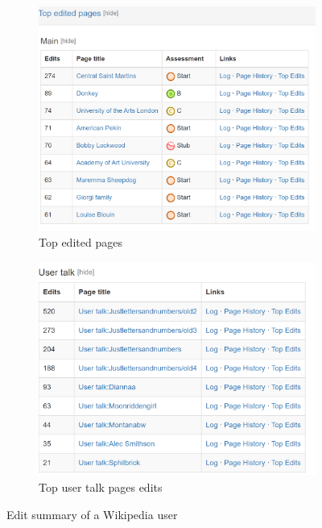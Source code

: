 \begin{figure}[!ht]
    \begin{subfigure}{0.49\textwidth}
        \centering
        \includegraphics[width=\textwidth]{images/editor_top_edits.PNG}
        \caption{Top edited pages}
        \label{fig:top-edits}
    \end{subfigure}
    \begin{subfigure}{0.49\textwidth}
        \centering
        \includegraphics[width=\textwidth]{images/editor_user_talk.PNG}
        \caption{Top user talk pages edits}
        \label{fig:user-talk-edits}
    \end{subfigure}

    \caption{Edit summary of a Wikipedia user}
    \label{fig:edit-summary}
\end{figure}